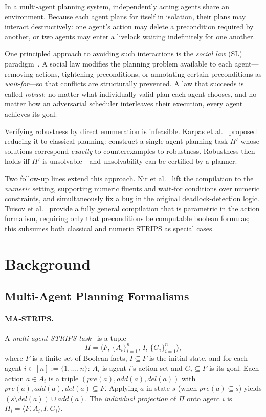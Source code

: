 \documentclass{article}
\theoremstyle{definition}
\newcommand{\pre}{\mathit{pre}}
\newcommand{\add}{\mathit{add}}
\newcommand{\del}{\mathit{del}}
\begin{document}
In a multi-agent planning system, independently acting agents share an environment. Because each agent plans for itself in isolation, their plans may interact destructively: one agent's action may delete a precondition required by another, or two agents may enter a livelock waiting indefinitely for one another.

One principled approach to avoiding such interactions is the \emph{social law} (SL) paradigm~\cite{tennenholtz1989}. A social law modifies the planning problem available to each agent---removing actions, tightening preconditions, or annotating certain preconditions as \emph{wait-for}---so that conflicts are structurally prevented. A law that succeeds is called \emph{robust}: no matter what individually valid plan each agent chooses, and no matter how an adversarial scheduler interleaves their execution, every agent achieves its goal.

Verifying robustness by direct enumeration is infeasible. Karpas et al.~\cite{karpas2017} proposed reducing it to classical planning: construct a single-agent planning task $\Pi'$ whose solutions correspond \emph{exactly} to counterexamples to robustness. Robustness then holds iff $\Pi'$ is unsolvable---and unsolvability can be certified by a planner.

Two follow-up lines extend this approach. Nir et al.~\cite{nir2023} lift the compilation to the \emph{numeric} setting, supporting numeric fluents and wait-for conditions over numeric constraints, and simultaneously fix a bug in the original deadlock-detection logic. Tuisov et al.~\cite{tuisov2025} provide a fully general compilation that is parametric in the action formalism, requiring only that preconditions be computable boolean formulas; this subsumes both classical and numeric STRIPS as special cases.

\section{Background}

\subsection{Multi-Agent Planning Formalisms}

\paragraph{MA-STRIPS.}
A \emph{multi-agent STRIPS task}~\cite{brafman2008} is a tuple
\[
  \Pi = \langle F,\, \{A_i\}_{i=1}^n,\, I,\, \{G_i\}_{i=1}^n \rangle,
\]
where $F$ is a finite set of Boolean facts, $I \subseteq F$ is the initial state, and for each agent $i \in [n] := \{1,\ldots,n\}$: $A_i$ is agent $i$'s action set and $G_i \subseteq F$ is its goal. Each action $a \in A_i$ is a triple $(\pre(a), \add(a), \del(a))$ with $\pre(a), \add(a), \del(a) \subseteq F$. Applying $a$ in state $s$ (when $\pre(a) \subseteq s$) yields $(s \setminus \del(a)) \cup \add(a)$. The \emph{individual projection} of $\Pi$ onto agent $i$ is $\Pi_i = \langle F, A_i, I, G_i \rangle$.
\end{document}
